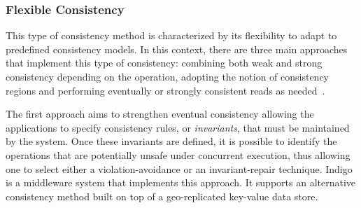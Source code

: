 \begin{comment}
Versatile Framework for Consistency
in~~Cloud Computing (VFC$^3$) \cite{esteves2012quality} {\al is} a consistency model that aims to enforce increasing degrees of consistency for different types of data. 
{\al It provides different} degrees of consistency that can be automatically adjusted based on statistical information, {\al being particularly suitable to large-scale and dynamic environments that need to syncronize large amounts of data over several geographically dispersed points.}

The key aspect of VFC's consistency method is the definition of three-dimensional consistency vectors ($\kappa$) that can be associated with data items. Time ($\theta$) specifies the maximum time a replica can be without being updated with is latest value. Sequence ($\sigma$) specifies the maximum number of updates that can be applied to an object without refreshing its replicas. Value ($\nu$) specifies the maximum relative difference between replica contents or against a constant, thus it captures the impact or importance of updates on the data items’ internal state. Once a client specify the intervals of values on the vectors ($\kappa$), VFC automatically adjust the consistency intensity. To perform this adjustment the VFC's Quality of Service (QoS) engine component observes the frequency of read and write operations to data items during a given time frame.
\end{comment}

\vspace{-0.2mm}
\subsubsection{Flexible Consistency}

This type of consistency method is characterized by its flexibility to adapt to predefined consistency models. In this context, there are three main approaches that implement this type of consistency: combining %
both weak and strong consistency depending on the operation, adopting the notion of consistency regions and performing eventually or strongly consistent reads as needed~\cite{balegas2015putting, Chen:2014, sivasubramanian2012amazon}.

The first approach aims to strengthen eventual consistency allowing the applications to specify consistency rules, or \textit{invariants}, that must be maintained by the system. Once these invariants are defined, it is possible to identify the operations that are potentially unsafe under concurrent execution, thus allowing one to select either a violation-avoid\-ance or an invariant-repair technique. Indigo \cite{balegas2015putting} is a middleware system that implements this approach. %
It supports an alternative consistency method %
built on top of a geo-replicated key-value data store.

